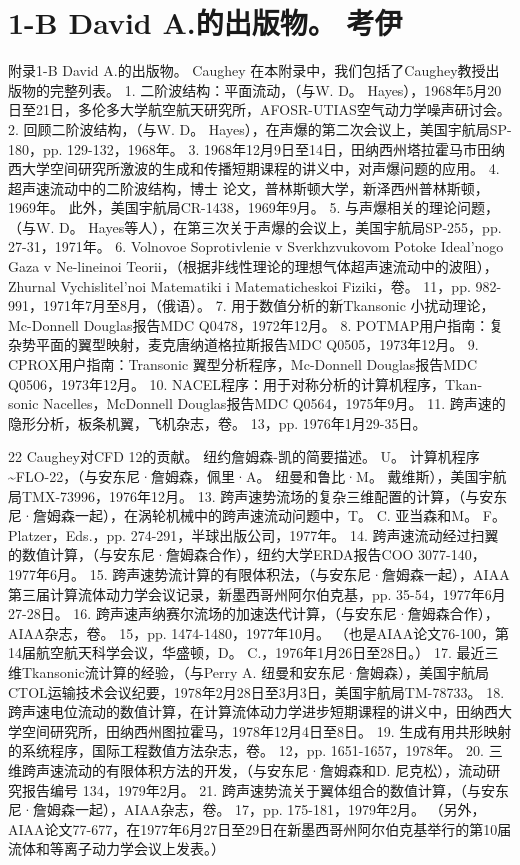 \documentclass[UTF8,11pt,a4paper,openany,fontset=fandol]{ctexbook}
\begin{document}
\section{1-B David A.的出版物。 考伊}
附录1-B David A.的出版物。 Caughey 在本附录中，我们包括了Caughey教授出版物的完整列表。 1. 二阶波结构：平面流动，（与W. D。 Hayes），1968年5月20日至21日，多伦多大学航空航天研究所，AFOSR-UTIAS空气动力学噪声研讨会。 2. 回顾二阶波结构，（与W. D。 Hayes），在声爆的第二次会议上，美国宇航局SP-180，pp. 129-132，1968年。 3. 1968年12月9日至14日，田纳西州塔拉霍马市田纳西大学空间研究所激波的生成和传播短期课程的讲义中，对声爆问题的应用。 4. 超声速流动中的二阶波结构，博士 论文，普林斯顿大学，新泽西州普林斯顿，1969年。 此外，美国宇航局CR-1438，1969年9月。 5. 与声爆相关的理论问题，（与W. D。 Hayes等人），在第三次关于声爆的会议上，美国宇航局SP-255，pp. 27-31，1971年。 6. Volnovoe Soprotivlenie v Sverkhzvukovom Potoke Ideal'nogo Gaza v Ne-lineinoi Teorii，（根据非线性理论的理想气体超声速流动中的波阻），Zhurnal Vychislitel'noi Matematiki i Matematicheskoi Fiziki，卷。 11，pp. 982-991，1971年7月至8月，（俄语）。 7. 用于数值分析的新Tkansonic 小扰动理论，Mc-Donnell Douglas报告MDC Q0478，1972年12月。 8. POTMAP用户指南：复杂势平面的翼型映射，麦克唐纳道格拉斯报告MDC Q0505，1973年12月。 9. CPROX用户指南：Transonic 翼型分析程序，Mc-Donnell Douglas报告MDC Q0506，1973年12月。 10. NACEL程序：用于对称分析的计算机程序，Tkan-sonic Nacelles，McDonnell Douglas报告MDC Q0564，1975年9月。 11. 跨声速的隐形分析，板条机翼，飞机杂志，卷。 13，pp. 1976年1月29-35日。

22 Caughey对CFD 12的贡献。 纽约詹姆森-凯的简要描述。 U。 计算机程序\textasciitilde{}FLO-22，（与安东尼·詹姆森，佩里·A。 纽曼和鲁比·M。 戴维斯），美国宇航局TMX-73996，1976年12月。 13. 跨声速势流场的复杂三维配置的计算，（与安东尼·詹姆森一起），在涡轮机械中的跨声速流动问题中，T。 C. 亚当森和M。 F。 Platzer，Eds.，pp. 274-291，半球出版公司，1977年。 14. 跨声速流动经过扫翼的数值计算，（与安东尼·詹姆森合作），纽约大学ERDA报告COO 3077-140，1977年6月。 15. 跨声速势流计算的有限体积法，（与安东尼·詹姆森一起），AIAA第三届计算流体动力学会议记录，新墨西哥州阿尔伯克基，pp. 35-54，1977年6月27-28日。 16. 跨声速声纳赛尔流场的加速迭代计算，（与安东尼·詹姆森合作），AIAA杂志，卷。 15，pp. 1474-1480，1977年10月。 （也是AIAA论文76-100，第14届航空航天科学会议，华盛顿，D。 C.，1976年1月26日至28日。） 17. 最近三维Tkansonic流计算的经验，（与Perry A. 纽曼和安东尼·詹姆森），美国宇航局CTOL运输技术会议纪要，1978年2月28日至3月3日，美国宇航局TM-78733。 18. 跨声速电位流动的数值计算，在计算流体动力学进步短期课程的讲义中，田纳西大学空间研究所，田纳西州图拉霍马，1978年12月4日至8日。 19. 生成有用共形映射的系统程序，国际工程数值方法杂志，卷。 12，pp. 1651-1657，1978年。 20. 三维跨声速流动的有限体积方法的开发，（与安东尼·詹姆森和D. 尼克松），流动研究报告编号 134，1979年2月。 21. 跨声速势流关于翼体组合的数值计算，（与安东尼·詹姆森一起），AIAA杂志，卷。 17，pp. 175-181，1979年2月。 （另外，AIAA论文77-677，在1977年6月27日至29日在新墨西哥州阿尔伯克基举行的第10届流体和等离子动力学会议上发表。）
\end{document}
